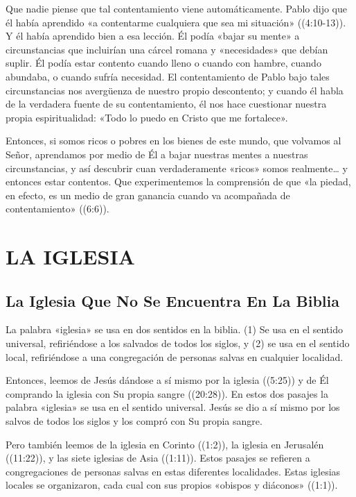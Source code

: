 \documentclass[12pt, twoside, openright]{book}
\begin{document}
Que nadie piense que tal contentamiento viene automáticamente. Pablo dijo que él había aprendido «a contentarme cualquiera que sea mi situación» ((4:10-13)). Y él había aprendido bien a esa lección. Él podía «bajar su mente» a circunstancias que incluirían una cárcel romana y «necesidades» que debían suplir. Él podía estar contento cuando lleno o cuando con hambre, cuando abundaba, o cuando sufría necesidad. El contentamiento de Pablo bajo tales circunstancias nos avergüenza de nuestro propio descontento; y cuando él habla de la verdadera fuente de su contentamiento, él nos hace cuestionar nuestra propia espiritualidad: «Todo lo puedo en Cristo que me fortalece».

Entonces, si somos ricos o pobres en los bienes de este mundo, que volvamos al Señor, aprendamos por medio de Él a bajar nuestras mentes a nuestras circunstancias, y así descubrir cuan verdaderamente «ricos» somos realmente… y entonces estar contentos. Que experimentemos la comprensión de que «la piedad, en efecto, es un medio de gran ganancia cuando va acompañada de contentamiento» ((6:6)).

\chapter{LA IGLESIA}

\section{La Iglesia Que No Se Encuentra En La Biblia}
La palabra «iglesia» se usa en dos sentidos en la biblia. (1) Se usa en el sentido universal, refiriéndose a los salvados de todos los siglos, y (2) se usa en el sentido local, refiriéndose a una congregación de personas salvas en cualquier localidad.

Entonces, leemos de Jesús dándose a sí mismo por la iglesia ((5:25)) y de Él comprando la iglesia con Su propia sangre ((20:28)). En estos dos pasajes la palabra «iglesia» se usa en el sentido universal. Jesús se dio a sí mismo por los salvos de todos los siglos y los compró con Su propia sangre.

Pero también leemos de la iglesia en Corinto ((1:2)), la iglesia en Jerusalén ((11:22)), y las siete iglesias de Asia ((1:11)). Estos pasajes se refieren a congregaciones de personas salvas en estas diferentes localidades. Estas iglesias locales se organizaron, cada cual con sus propios «obispos y diáconos» ((1:1)).
\end{document}
